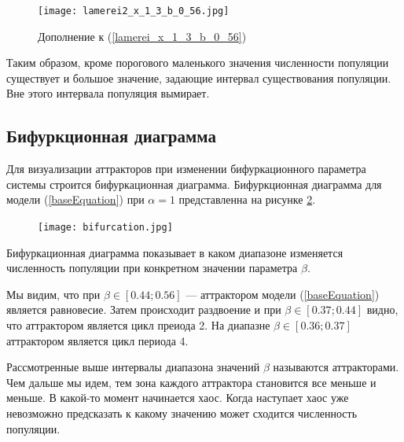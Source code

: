         \begin{figure}
            \centering
            \texttt{[image: lamerei2\_x\_1\_3\_b\_0\_56.jpg]}
    
            \captionsetup{justification=centering}
            \caption{Дополнение к (\ref{lamerei_x_1_3_b_0_56})}
            \label{lamerei2_x_1_3_b_0_56}
        \end{figure}

        Таким образом, кроме порогового маленького значения численности популяции существует и большое значение, задающие интервал существования популяции. Вне этого интервала популяция вымирает. 

    \subsection{Бифуркционная диаграмма}    

        Для визуализации аттракторов при изменении бифуркационного параметра системы строится бифуркационная диаграмма. Бифуркционная диаграмма для модели (\ref{baseEquation}) при \(\alpha = 1\) представленна на рисунке \ref{bifurcation}.

        \begin{figure}
            \centering
            \texttt{[image: bifurcation.jpg]}

            \captionsetup{justification=centering}
            \caption{}
            \label{bifurcation}
        \end{figure}

        Бифуркационная диаграмма показывает в каком диапазоне изменяется численность популяции при конкретном значении параметра \(\beta\).

        Мы видим, что при \(\beta \in [0.44; 0.56]\) --- аттрактором модели (\ref{baseEquation}) является равновесие. Затем происходит раздвоение и при \(\beta \in [0.37; 0.44]\) видно, что аттрактором является цикл преиода 2. На диапазне \(\beta \in [0.36; 0.37]\) аттрактором является цикл периода 4.
        
        Рассмотренные выше интервалы диапазона значений \(\beta\) называются аттракторами. Чем дальше мы идем, тем зона каждого аттрактора становится все меньше и меньше. В какой-то момент начинается хаос. Когда наступает хаос уже невозможно предсказать к какому значению может сходится численность популяции.



